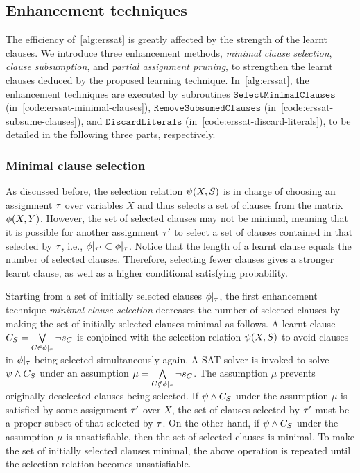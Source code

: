 \subsection{Enhancement techniques}
The efficiency of~\cref{alg:erssat} is greatly affected by the strength of the learnt clauses.
We introduce three enhancement methods,
\textit{minimal clause selection},
\textit{clause subsumption}, and
\textit{partial assignment pruning},
to strengthen the learnt clauses deduced by the proposed learning technique.
In~\cref{alg:erssat},
the enhancement techniques are executed by subroutines
$\texttt{SelectMinimalClauses}$ (in~\cref{code:erssat-minimal-clauses}),
$\texttt{RemoveSubsumedClauses}$ (in~\cref{code:erssat-subsume-clauses}), and
$\texttt{DiscardLiterals}$ (in~\cref{code:erssat-discard-literals}),
to be detailed in the following three parts, respectively.

\subsubsection{Minimal clause selection}
As discussed before,
the selection relation $\psi(X,S)$ is in charge of choosing an assignment $\tau$ over variables $X$ and thus selects a set of clauses from the matrix $\phi(X,Y)$.
However, the set of selected clauses may not be minimal,
meaning that it is possible for another assignment $\tau'$ to select a set of clauses contained in that selected by $\tau$, i.e., $\phi|_{\tau'}\subset\phi|_{\tau}$.
Notice that the length of a learnt clause equals the number of selected clauses.
Therefore, selecting fewer clauses gives a stronger learnt clause,
as well as a higher conditional satisfying probability.

Starting from a set of initially selected clauses $\phi|_{\tau}$,
the first enhancement technique \textit{minimal clause selection} decreases the number of selected clauses by making the set of initially selected clauses minimal as follows.
A learnt clause $C_S=\bigvee\limits_{C\in\phi|_{\tau}}\lnot s_{C}$ is conjoined with the selection relation $\psi(X,S)$ to avoid clauses in $\phi|_{\tau}$ being selected simultaneously again.
A SAT solver is invoked to solve $\psi\land C_S$ under an assumption $\mu=\bigwedge\limits_{C\notin\phi|_{\tau}}\lnot s_{C}$.
The assumption $\mu$ prevents originally deselected clauses being selected.
If $\psi\land C_S$ under the assumption $\mu$ is satisfied by some assignment $\tau'$ over $X$,
the set of clauses selected by $\tau'$ must be a proper subset of that selected by $\tau$.
On the other hand, if $\psi\land C_S$ under the assumption $\mu$ is unsatisfiable,
then the set of selected clauses is minimal.
To make the set of initially selected clauses minimal,
the above operation is repeated until the selection relation becomes unsatisfiable.

